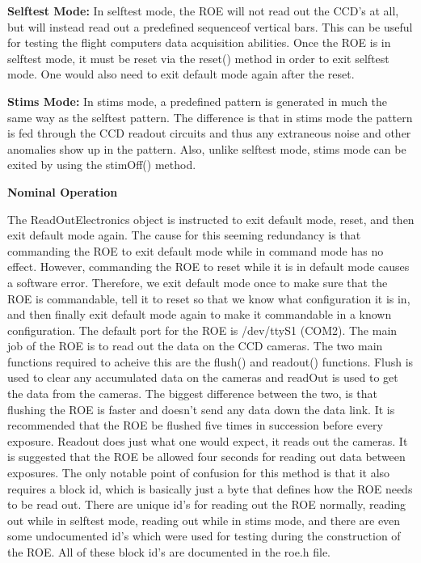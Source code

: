 \textbf{Selftest Mode:}
In selftest mode, the ROE will not read out the CCD’s at all, but will instead read out a predefined sequenceof vertical bars. This can be useful for testing the flight computers data acquisition abilities. Once the ROE is in selftest mode, it must be reset via the reset() method in order to exit selftest mode. One would also need to exit default mode again after the reset.

\textbf{Stims Mode:}
In stims mode,  a predefined pattern is generated in much the same way as the selftest pattern. The difference is that in stims mode the pattern is fed through the CCD readout circuits and thus any extraneous noise and other anomalies show up in the pattern. Also, unlike selftest mode, stims mode can be exited by using the stimOff() method.

\textbf{Nominal Operation}

The ReadOutElectronics object is instructed to exit default mode, reset, and then exit default mode again. The cause for this seeming redundancy is that commanding the ROE to exit default mode while in command mode has no effect. However, commanding the ROE to reset while it is in default mode causes a software error. Therefore, we exit default mode once to make sure that the ROE is commandable, tell it to reset so that we know what configuration it is in, and then finally exit default mode again to make it commandable in a known configuration. The default port for the ROE is /dev/ttyS1 (COM2).
The main job of the ROE is to read out the data on the CCD cameras. The two main functions required to acheive this are the flush() and readout() functions. Flush is used to clear any accumulated data on the cameras and readOut is used to get the data from the cameras. The biggest difference between the two, is that flushing the ROE is faster and doesn’t send any data down the data link. It is recommended that the ROE be flushed five times in succession before every exposure. Readout does just what one would expect, it reads out the cameras. It is suggested that the ROE be allowed four seconds for reading out data between exposures. The only notable point of confusion for this method is that it also requires a block id, which is basically just a byte that defines how the ROE needs to be read out. There are unique id’s for reading out the ROE normally, reading out while in selftest mode, reading out while in stims mode, and there are even some undocumented id’s which were used for testing during the construction of the ROE. All of these block id’s are documented in the roe.h file.

